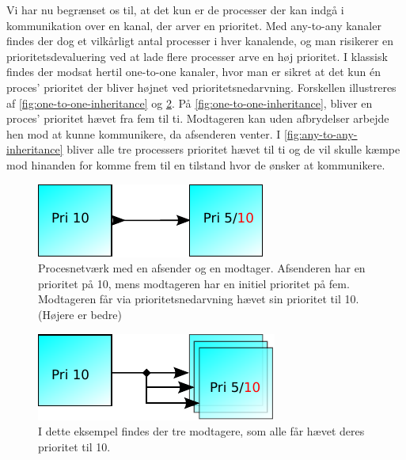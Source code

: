 Vi har nu begrænset os til, at det kun er de processer der kan indgå i kommunikation over en kanal, der arver en prioritet. Med any-to-any kanaler findes der dog et vilkårligt antal processer i hver kanalende, og man risikerer en prioritetsdevaluering ved at lade flere processer arve en høj prioritet. I klassisk \csp findes der modsat hertil one-to-one kanaler, hvor man er sikret at det kun én proces' prioritet der bliver højnet ved prioritetsnedarvning. Forskellen illustreres af \autoref{fig:one-to-one-inheritance} og \cref{fig:any-to-any-inheritance}. På \autoref{fig:one-to-one-inheritance}, bliver en proces' prioritet hævet fra fem til ti. Modtageren kan uden afbrydelser arbejde hen mod at kunne kommunikere, da afsenderen venter. I \autoref{fig:any-to-any-inheritance} bliver alle tre processers prioritet hævet til ti og de vil skulle kæmpe mod hinanden for komme frem til en tilstand hvor de ønsker at kommunikere. 

\begin{figure}
 \begin{center}
  \includegraphics[scale=1.00]{images/one-to-one-inheritance}
\caption{Procesnetværk med en afsender og en modtager. Afsenderen har en prioritet på  10, mens modtageren har en initiel prioritet på fem. Modtageren  får via prioritetsnedarvning hævet sin prioritet til 10. (Højere er bedre)}
  \label{fig:one-to-one-inheritance}
  \end{center}
\end{figure}

\begin{figure}
 \begin{center}
  \includegraphics[scale=1.00]{images/any-to-any-inheritance}
  \caption{I dette eksempel findes der tre modtagere, som alle får hævet deres prioritet til 10.}
  \label{fig:any-to-any-inheritance}
  \end{center}
\end{figure}

